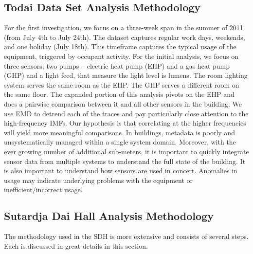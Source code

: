 \subsection{Todai Data Set Analysis Methodology}
For the first investigation, we focus on a three-week span in the summer of 2011 (from July 4th to July 24th).
The dataset captures regular work days, weekends, and one holiday (July 18th).  This timeframe captures
the typical usage of the equipment, triggered by occupant activity.  For the initial
analysis, we focus on three sensors; two pumps -- electric heat pump (EHP) and a gas heat pump (GHP) and a light feed,
that measure the light level is lumens.  
The room lighting system serves the same room as the EHP.  The GHP
serves a different room on the same floor.  The expanded portion of this analysis pivots on the EHP
and does a pairwise comparison between it and all other sensors in the building.
We use EMD to detrend each of the traces and pay particularly close attention to the high-frequency IMFs.  Our 
hypothesis is that correlating at the higher frequencies will yield more meaningful comparisons.
In buildings, metadata is poorly and unsystematically managed within a single system domain.  Moreover, 
with the ever growing number of additional sub-meters, it is important to quickly integrate
sensor data from multiple systems to understand the full state of the building.  It is also important to 
understand how sensors are used in concert.  Anomalies in usage may indicate underlying problems with 
the equipment or inefficient/incorrect usage.  




\subsection{Sutardja Dai Hall Analysis Methodology}
The methodology used in the SDH is more extensive and consists of several steps. Each is discussed in great details
in this section.

